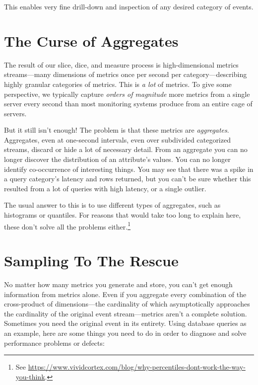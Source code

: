 \documentclass{vivid_layout}
\begin{document}
This enables very fine drill-down and inspection of any desired category of
events.

\section{The Curse of Aggregates}

The result of our slice, dice, and measure process is high-dimensional metrics
streams---many dimensions of metrics once per second per category---describing
highly granular categories of metrics. This is \emph{a lot} of metrics. To give
some perspective, we typically capture \emph{orders of magnitude} more metrics
from a single server every second than most monitoring systems produce from an
entire cage of servers.

But it still isn't enough! The problem is that these metrics are
\emph{aggregates}. Aggregates, even at one-second intervals, even over
subdivided categorized streams, discard or hide a lot of necessary detail. From an
aggregate you can no longer discover the distribution of an attribute's values.
You can no longer identify co-occurrence of interesting things. You may see that
there was a spike in a query category's latency and rows returned, but you can't
be sure whether this resulted from a lot of queries with high latency, or a
single outlier.

The usual answer to this is to use different types of aggregates, such as
histograms or quantiles. For reasons that would take too long to explain here,
these don't solve all the problems either.\footnote{See
\href{https://www.vividcortex.com/blog/why-percentiles-dont-work-the-way-you-think}{https://www.vividcortex.com/blog/why-percentiles-dont-work-the-way-you-think}.}

\section{Sampling To The Rescue}

No matter how many metrics you generate and store, you can't get enough
information from metrics alone. Even if you aggregate every combination of the
cross-product of dimensions---the cardinality of which asymptotically approaches
the cardinality of the original event stream---metrics aren't a complete
solution. Sometimes you need the original event in its entirety. Using database
queries as an example, here are some things you need to do in order to diagnose
and solve performance problems or defects:
\end{document}
